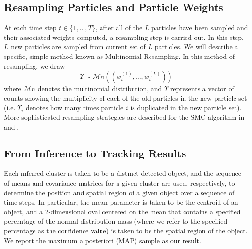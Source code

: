 \documentclass{article}
\begin{document}


\subsection{Resampling Particles and Particle Weights}
\label{sec:resample}

At each time step $t \in \{ 1, \ldots, T \}$, after all of the $L$ particles have been sampled and their associated weights computed, a resampling step is carried out. In this step, $L$ new particles are sampled from current set of $L$ particles. We will describe a specific, simple method known as Multinomial Resampling. In this method of resampling, we draw
\begin{equation}
\Upsilon \sim \mathcal{M}n((w_{t}^{(1)}, \ldots, w_{t}^{(L)}))
\end{equation}
where $\mathcal{M}n$ denotes the multinomial distribution, and $\Upsilon$ represents a vector of counts showing the multiplicity of each of the old particles in the new particle set (i.e. $\Upsilon_{i}$ denotes how many times particle $i$ is duplicated in the new particle set). More sophisticated resampling strategies are described for the SMC algorithm in \cite{gasthaus_thesis} and \cite{douc2005comparison}.


\subsection{From Inference to Tracking Results}
\label{sec:inferencetotrackingresults}

Each inferred cluster is taken to be a distinct detected object, and the sequence of means and covariance matrices for a given cluster are used, respectively, to determine the position and spatial region of a given object over a sequence of time steps. In particular, the mean parameter is taken to be the centroid of an object, and a 2-dimensional oval centered on the mean that contains a specified percentage of the normal distribution mass (where we refer to the specified percentage as the confidence value) is taken to be the spatial region of the object. We report the maximum a posteriori (MAP) sample as our result.
\end{document}
